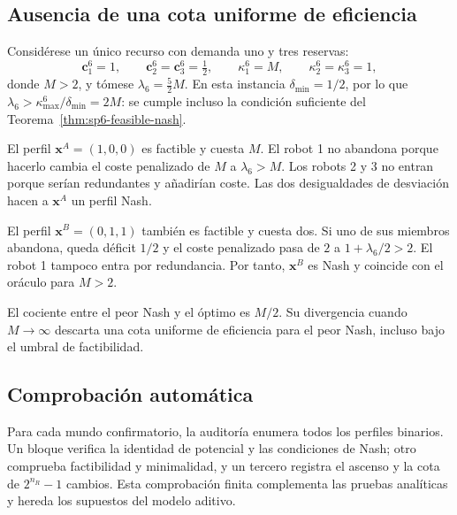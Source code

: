 \subsection{Ausencia de una cota uniforme de eficiencia}
\label{app:sp6-poa-proof}

Considérese un único recurso con demanda uno y tres reservas:
\[
 \boldsymbol c_1^6=1,
 \qquad \boldsymbol c_2^6=\boldsymbol c_3^6=\tfrac12,
 \qquad
 \kappa_1^6=M,
 \qquad \kappa_2^6=\kappa_3^6=1,
\]
donde $M>2$, y tómese $\lambda_6=\tfrac52M$. En esta instancia $\delta_{\min}=1/2$, por lo que $\lambda_6>\kappa_{\max}^6/\delta_{\min}=2M$: se cumple incluso la condición suficiente del Teorema~\ref{thm:sp6-feasible-nash}.

El perfil $\boldsymbol x^A=(1, 0, 0)$ es factible y cuesta $M$. El robot 1 no abandona porque hacerlo cambia el coste penalizado de $M$ a $\lambda_6>M$. Los robots 2 y 3 no entran porque serían redundantes y añadirían coste. Las dos desigualdades de desviación hacen a \(\boldsymbol x^A\) un perfil Nash.

El perfil $\boldsymbol x^B=(0, 1, 1)$ también es factible y cuesta dos. Si uno de sus miembros abandona, queda déficit $1/2$ y el coste penalizado pasa de $2$ a $1+\lambda_6/2>2$. El robot 1 tampoco entra por redundancia. Por tanto, $\boldsymbol x^B$ es Nash y coincide con el oráculo para $M>2$.

El cociente entre el peor Nash y el óptimo es \(M/2\). Su divergencia cuando \(M\to\infty\) descarta una cota uniforme de eficiencia para el peor Nash, incluso bajo el umbral de factibilidad.

\subsection{Comprobación automática}

Para cada mundo confirmatorio, la auditoría enumera todos los perfiles binarios. Un bloque verifica la identidad de potencial y las condiciones de Nash; otro comprueba factibilidad y minimalidad, y un tercero registra el ascenso y la cota de \(2^{n_R}-1\) cambios. Esta comprobación finita complementa las pruebas analíticas y hereda los supuestos del modelo aditivo.
\fi
